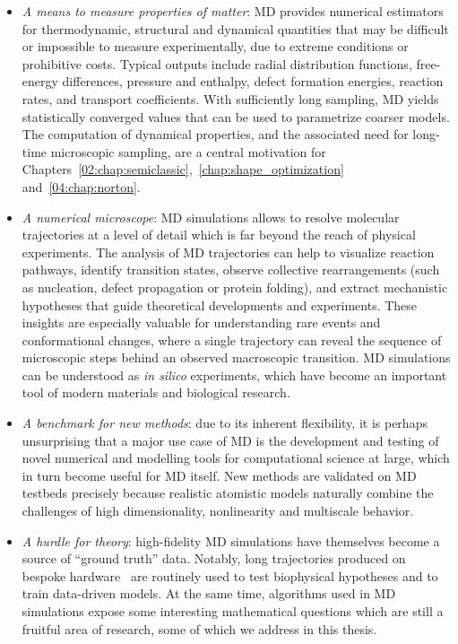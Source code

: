 \begin{itemize}
\item \textit{A means to measure properties of matter}: MD provides numerical estimators for thermodynamic, structural and dynamical quantities that may be difficult or impossible to measure experimentally, due to extreme conditions or prohibitive costs. Typical outputs include radial distribution functions, free-energy differences, pressure and enthalpy, defect formation energies, reaction rates, and transport coefficients. With sufficiently long sampling, MD yields statistically converged values that can be used to parametrize coarser models. The computation of dynamical properties, and the associated need for long-time microscopic sampling, are a central motivation for Chapters~\ref{02:chap:semiclassic},~\ref{chap:shape_optimization} and~\ref{04:chap:norton}.
  \item \textit{A numerical microscope}: MD simulations allows to resolve molecular trajectories at a level of detail which is far beyond the reach of physical experiments. The analysis of MD trajectories can help to visualize reaction pathways, identify transition states, observe collective rearrangements (such as nucleation, defect propagation or protein folding), and extract mechanistic hypotheses that guide theoretical developments and experiments. These insights are especially valuable for understanding rare events and conformational changes, where a single trajectory can reveal the sequence of microscopic steps behind an observed macroscopic transition. MD simulations can be understood as \textit{in silico} experiments, which have become an important tool of modern materials and biological research.
  \item \textit{A benchmark for new methods}: due to its inherent flexibility, it is perhaps unsurprising that a major use case of MD is the development and testing of novel numerical and modelling tools for computational science at large, which in turn become useful for MD itself. New methods are validated on MD testbeds precisely because realistic atomistic models naturally combine the challenges of high dimensionality, nonlinearity and multiscale behavior.
  \item \textit{A hurdle for theory}: high-fidelity MD simulations have themselves become a source of ``ground truth'' data. Notably, long trajectories produced on bespoke hardware~\cite{SDDKLSYBBCal08} are routinely used to test biophysical hypotheses and to train data-driven models. At the same time, algorithms used in MD simulations expose some interesting mathematical questions which are still a fruitful area of research, some of which we address in this thesis.
\end{itemize}

